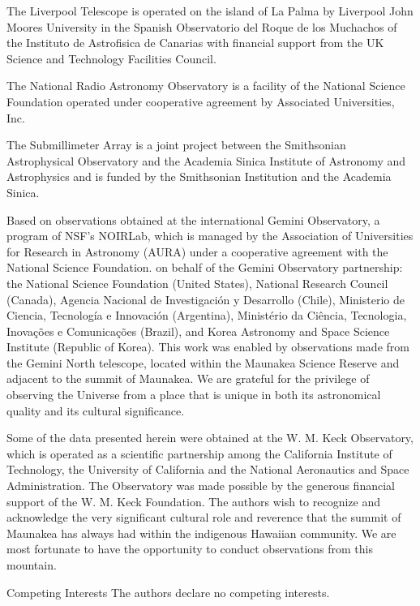 \documentclass{nature_plusfigure}
\begin{document}
\begin{addendum}
The Liverpool Telescope is operated on the island of La Palma by Liverpool John Moores University in the Spanish Observatorio del Roque de los Muchachos of the Instituto de Astrofisica de Canarias with financial support from the UK Science and Technology Facilities Council.

The National Radio Astronomy Observatory is a facility of the National Science Foundation operated under cooperative agreement by Associated Universities, Inc.

The Submillimeter Array is a joint project between the Smithsonian Astrophysical Observatory and the Academia Sinica Institute of Astronomy and Astrophysics and is funded by the Smithsonian Institution and the Academia Sinica.

Based on observations obtained at the international Gemini Observatory, a program of NSF’s NOIRLab, which is managed by the Association of Universities for Research in Astronomy (AURA) under a cooperative agreement with the National Science Foundation. on behalf of the Gemini Observatory partnership: the National Science Foundation (United States), National Research Council (Canada), Agencia Nacional de Investigaci\'{o}n y Desarrollo (Chile), Ministerio de Ciencia, Tecnolog\'{i}a e Innovaci\'{o}n (Argentina), Minist\'{e}rio da Ci\^{e}ncia, Tecnologia, Inova\c{c}\~{o}es e Comunica\c{c}\~{o}es (Brazil), and Korea Astronomy and Space Science Institute (Republic of Korea). This work was enabled by observations made from the Gemini North telescope, located within the Maunakea Science Reserve and adjacent to the summit of Maunakea. We are grateful for the privilege of observing the Universe from a place that is unique in both its astronomical quality and its cultural significance.

Some of the data presented herein were obtained at the W. M. Keck Observatory, which is operated as a scientific partnership among the California Institute of Technology, the University of California and the National Aeronautics and Space Administration. The Observatory was made possible by the generous financial support of the W. M. Keck Foundation.
The authors wish to recognize and acknowledge the very significant cultural role and reverence that the summit of Maunakea has always had within the indigenous Hawaiian community.  We are most fortunate to have the opportunity to conduct observations from this mountain.




 \item[Competing Interests] The authors declare no competing interests.


\end{addendum}
\end{document}

